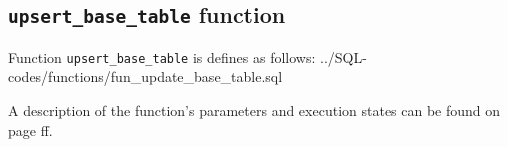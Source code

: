 \subsection{\texttt{upsert\_base\_table} function}\label{subsec_appx_fun_upsert_base_table}

Function \texttt{upsert\_base\_table} is defines as follows:
%
{../SQL-codes/functions/fun_update_base_table.sql}

A description of the function's parameters and execution states can be found on page \pageref{subsec_upsert_data_function} ff.